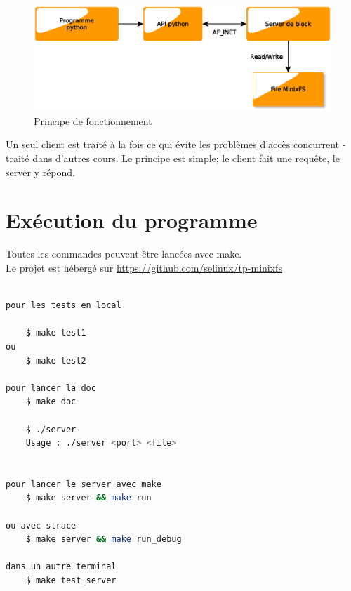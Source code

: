 \documentclass[a4paper,12pt]{article}
\begin{document}
\vspace{2cm}

\begin{figure}[H]
\begin{center}
\includegraphics[scale=.6]{imgs/schema_client_server}
\caption{Principe de fonctionnement}
\label{fig:Architecture client server}
\end{center}
\end{figure}


Un seul client est traité à la fois ce qui évite les problèmes d'accès concurrent - traité dans d'autres cours. Le principe est simple; le client fait une requête, le server y répond.\\

\pagebreak

\section{Exécution du programme}

Toutes les commandes peuvent être lancées avec make.\\

Le projet est hébergé sur \url{https://github.com/selinux/tp-minixfs}

\begin{lstlisting}[language=bash,caption={lancer le server}]

pour les tests en local

	$ make test1
ou
	$ make test2
	
pour lancer la doc
	$ make doc

	$ ./server
	Usage : ./server <port> <file>
	
	
pour lancer le server avec make
	$ make server && make run

ou avec strace
	$ make server && make run_debug
	
dans un autre terminal
	$ make test_server

\end{lstlisting}

\pagebreak
\end{document}

